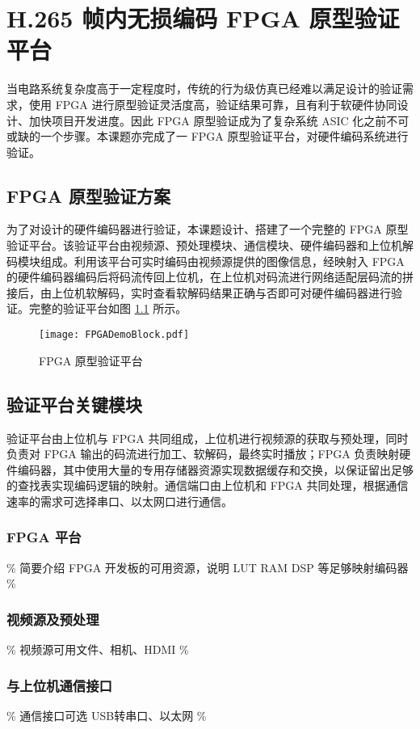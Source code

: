 \chapter{H.265 帧内无损编码 FPGA 原型验证平台}
\label{cha:c5}
当电路系统复杂度高于一定程度时，传统的行为级仿真已经难以满足设计的验证需求，使用 FPGA 进行原型验证灵活度高，验证结果可靠，且有利于软硬件协同设计、加快项目开发进度。因此 FPGA 原型验证成为了复杂系统 ASIC 化之前不可或缺的一个步骤。本课题亦完成了一 FPGA 原型验证平台，对硬件编码系统进行验证。

\section{FPGA 原型验证方案}
为了对设计的硬件编码器进行验证，本课题设计、搭建了一个完整的 FPGA 原型验证平台。该验证平台由视频源、预处理模块、通信模块、硬件编码器和上位机解码模块组成。利用该平台可实时编码由视频源提供的图像信息，经映射入 FPGA 的硬件编码器编码后将码流传回上位机，在上位机对码流进行网络适配层码流的拼接后，由上位机软解码，实时查看软解码结果正确与否即可对硬件编码器进行验证。完整的验证平台如图 \ref{fig:FPGADemoBlock} 所示。
\begin{figure}[hbt]
    \centering
    \texttt{[image: FPGADemoBlock.pdf]}
    \caption{FPGA 原型验证平台}
    \label{fig:FPGADemoBlock}
\end{figure}

\section{验证平台关键模块}
验证平台由上位机与 FPGA 共同组成，上位机进行视频源的获取与预处理，同时负责对 FPGA 输出的码流进行加工、软解码，最终实时播放；FPGA 负责映射硬件编码器，其中使用大量的专用存储器资源实现数据缓存和交换，以保证留出足够的查找表实现编码逻辑的映射。通信端口由上位机和 FPGA 共同处理，根据通信速率的需求可选择串口、以太网口进行通信。
\subsection{FPGA 平台}
\% 简要介绍 FPGA 开发板的可用资源，说明 LUT RAM DSP 等足够映射编码器 \%

\subsection{视频源及预处理}
\% 视频源可用文件、相机、HDMI \%

\subsection{与上位机通信接口}
\% 通信接口可选 USB转串口、以太网 \%

